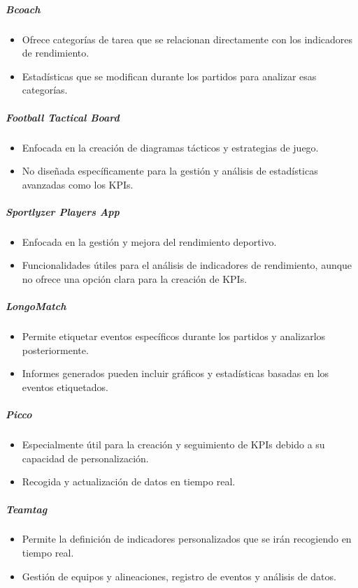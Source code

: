 \subparagraph{Bcoach}
\begin{itemize}
    \item Ofrece categorías de tarea que se relacionan directamente con los indicadores de rendimiento.
    \item Estadísticas que se modifican durante los partidos para analizar esas categorías.
\end{itemize}
\subparagraph{Football Tactical Board}
\begin{itemize}
    \item Enfocada en la creación de diagramas tácticos y estrategias de juego.
    \item No diseñada específicamente para la gestión y análisis de estadísticas avanzadas como los KPIs.
\end{itemize}

\subparagraph{Sportlyzer Players App}
\begin{itemize}
    \item Enfocada en la gestión y mejora del rendimiento deportivo.
    \item Funcionalidades útiles para el análisis de indicadores de rendimiento, aunque no ofrece una opción clara para la creación de KPIs.
\end{itemize}

\subparagraph{LongoMatch}
\begin{itemize}
    \item Permite etiquetar eventos específicos durante los partidos y analizarlos posteriormente.
    \item Informes generados pueden incluir gráficos y estadísticas basadas en los eventos etiquetados.
\end{itemize}

\subparagraph{Picco}
\begin{itemize}
    \item Especialmente útil para la creación y seguimiento de KPIs debido a su capacidad de personalización.
    \item Recogida y actualización de datos en tiempo real.
\end{itemize}

\subparagraph{Teamtag}
\begin{itemize}
    \item Permite la definición de indicadores personalizados que se irán recogiendo en tiempo real.
    \item Gestión de equipos y alineaciones, registro de eventos y análisis de datos.
\end{itemize}

